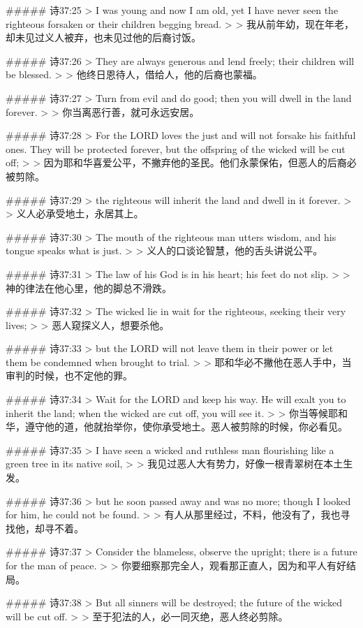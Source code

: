 ##### 诗37:25
> I was young and now I am old, yet I have never seen the righteous forsaken or their children begging bread.
>
> 我从前年幼，现在年老，却未见过义人被弃，也未见过他的后裔讨饭。


##### 诗37:26
> They are always generous and lend freely; their children will be blessed.
>
> 他终日恩待人，借给人，他的后裔也蒙福。


##### 诗37:27
> Turn from evil and do good; then you will dwell in the land forever.
>
> 你当离恶行善，就可永远安居。


##### 诗37:28
> For the LORD loves the just and will not forsake his faithful ones. They will be protected forever, but the offspring of the wicked will be cut off;
>
> 因为耶和华喜爱公平，不撇弃他的圣民。他们永蒙保佑，但恶人的后裔必被剪除。


##### 诗37:29
> the righteous will inherit the land and dwell in it forever.
>
> 义人必承受地土，永居其上。


##### 诗37:30
> The mouth of the righteous man utters wisdom, and his tongue speaks what is just.
>
> 义人的口谈论智慧，他的舌头讲说公平。


##### 诗37:31
> The law of his God is in his heart; his feet do not slip.
>
> 神的律法在他心里，他的脚总不滑跌。


##### 诗37:32
> The wicked lie in wait for the righteous, seeking their very lives;
>
> 恶人窥探义人，想要杀他。


##### 诗37:33
> but the LORD will not leave them in their power or let them be condemned when brought to trial.
>
> 耶和华必不撇他在恶人手中，当审判的时候，也不定他的罪。


##### 诗37:34
> Wait for the LORD and keep his way. He will exalt you to inherit the land; when the wicked are cut off, you will see it.
>
> 你当等候耶和华，遵守他的道，他就抬举你，使你承受地土。恶人被剪除的时候，你必看见。


##### 诗37:35
> I have seen a wicked and ruthless man flourishing like a green tree in its native soil,
>
> 我见过恶人大有势力，好像一根青翠树在本土生发。


##### 诗37:36
> but he soon passed away and was no more; though I looked for him, he could not be found.
>
> 有人从那里经过，不料，他没有了，我也寻找他，却寻不着。


##### 诗37:37
> Consider the blameless, observe the upright; there is a future for the man of peace.
>
> 你要细察那完全人，观看那正直人，因为和平人有好结局。


##### 诗37:38
> But all sinners will be destroyed; the future of the wicked will be cut off.
>
> 至于犯法的人，必一同灭绝，恶人终必剪除。



